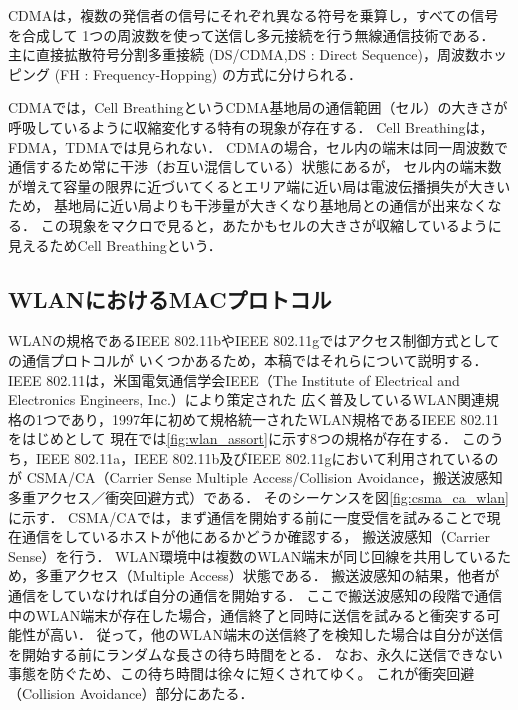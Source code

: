 \documentclass[12pt]{jreport}
\begin{document}
CDMAは，複数の発信者の信号にそれぞれ異なる符号を乗算し，すべての信号を合成して
1つの周波数を使って送信し多元接続を行う無線通信技術である．
主に直接拡散符号分割多重接続 (DS/CDMA,DS : Direct Sequence)，周波数ホッピング (FH : Frequency-Hopping) の方式に分けられる．

CDMAでは，Cell BreathingというCDMA基地局の通信範囲（セル）の大きさが呼吸しているように収縮変化する特有の現象が存在する．
Cell Breathingは，FDMA，TDMAでは見られない．
CDMAの場合，セル内の端末は同一周波数で通信するため常に干渉（お互い混信している）状態にあるが，
セル内の端末数が増えて容量の限界に近づいてくるとエリア端に近い局は電波伝播損失が大きいため，
基地局に近い局よりも干渉量が大きくなり基地局との通信が出来なくなる．
この現象をマクロで見ると，あたかもセルの大きさが収縮しているように見えるためCell Breathingという．

\subsection{WLANにおけるMACプロトコル}
\label{sec:ieee_ 802.11}

WLANの規格であるIEEE 802.11bやIEEE 802.11gではアクセス制御方式としての通信プロトコルが
いくつかあるため，本稿ではそれらについて説明する．
IEEE 802.11は，米国電気通信学会IEEE（The Institute of Electrical and Electronics Engineers, Inc.）により策定された
広く普及しているWLAN関連規格の1つであり，1997年に初めて規格統一されたWLAN規格であるIEEE 802.11をはじめとして
現在では\ref{fig:wlan_assort}に示す8つの規格が存在する．
このうち，IEEE 802.11a，IEEE 802.11b及びIEEE 802.11gにおいて利用されているのが
CSMA/CA（Carrier Sense Multiple Access/Collision Avoidance，搬送波感知多重アクセス／衝突回避方式）である．
そのシーケンスを図\ref{fig:csma_ca_wlan}に示す．
CSMA/CAでは，まず通信を開始する前に一度受信を試みることで現在通信をしているホストが他にあるかどうか確認する，
搬送波感知（Carrier Sense）を行う．
WLAN環境中は複数のWLAN端末が同じ回線を共用しているため，多重アクセス（Multiple Access）状態である．
搬送波感知の結果，他者が通信をしていなければ自分の通信を開始する．
ここで搬送波感知の段階で通信中のWLAN端末が存在した場合，通信終了と同時に送信を試みると衝突する可能性が高い．
従って，他のWLAN端末の送信終了を検知した場合は自分が送信を開始する前にランダムな長さの待ち時間をとる．
なお、永久に送信できない事態を防ぐため、この待ち時間は徐々に短くされてゆく。
これが衝突回避（Collision Avoidance）部分にあたる．
\end{document}
